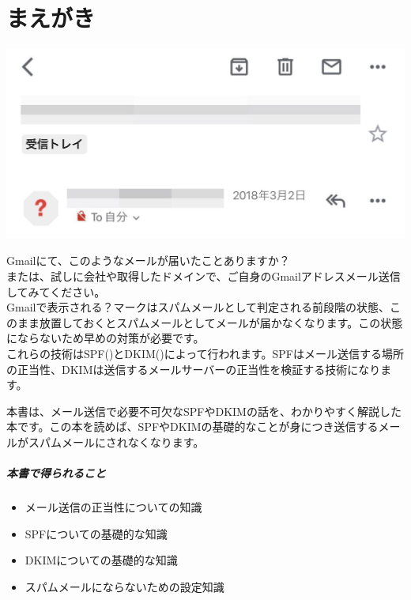 \chapter{まえがき}
\label{chap:chap00-preface}
\begin{reviewimage}%
\includegraphics[width=\maxwidth]{./images/chap00-preface/gmail.png}%
\label{image:chap00-preface:gmail}
\end{reviewimage}

Gmailにて、このようなメールが届いたことありますか？\\
または、試しに会社や取得したドメインで、ご自身のGmailアドレスメール送信してみてください。\\
Gmailで表示される？マークはスパムメールとして判定される前段階の状態、このまま放置しておくとスパムメールとしてメールが届かなくなります。この状態にならないため早めの対策が必要です。\\
これらの技術はSPF()とDKIM()によって行われます。SPFはメール送信する場所の正当性、DKIMは送信するメールサーバーの正当性を検証する技術になります。

本書は、メール送信で必要不可欠なSPFやDKIMの話を、わかりやすく解説した本です。この本を読めば、SPFやDKIMの基礎的なことが身につき送信するメールがスパムメールにされなくなります。

\paragraph*{本書で得られること}
\label{sec:-0-0-0-1}

\begin{itemize}
\item メール送信の正当性についての知識
\item SPFについての基礎的な知識
\item DKIMについての基礎的な知識
\item スパムメールにならないための設定知識
\end{itemize}

